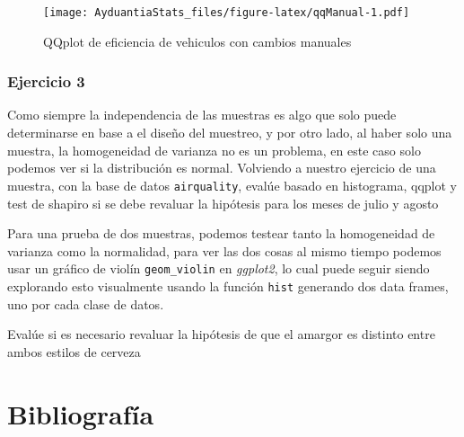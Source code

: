 \documentclass[]{book}
\newenvironment{Shaded}{\begin{snugshade}}{\end{snugshade}}
\newcommand{\KeywordTok}[1]{\textcolor[rgb]{0.13,0.29,0.53}{\textbf{#1}}}
\newcommand{\OperatorTok}[1]{\textcolor[rgb]{0.81,0.36,0.00}{\textbf{#1}}}
\newcommand{\NormalTok}[1]{#1}
\begin{document}
\begin{Shaded}
\end{Shaded}

\begin{figure}
\centering
\texttt{[image: AyduantiaStats\_files/figure-latex/qqManual-1.pdf]}
\caption{\label{fig:qqManual}QQplot de eficiencia de vehiculos con cambios
manuales}
\end{figure}

\subsubsection{Ejercicio 3}\label{ejercicio-3}

Como siempre la independencia de las muestras es algo que solo puede
determinarse en base a el diseño del muestreo, y por otro lado, al haber
solo una muestra, la homogeneidad de varianza no es un problema, en este
caso solo podemos ver si la distribución es normal. Volviendo a nuestro
ejercicio de una muestra, con la base de datos \texttt{airquality},
evalúe basado en histograma, qqplot y test de shapiro si se debe
revaluar la hipótesis para los meses de julio y agosto

Para una prueba de dos muestras, podemos testear tanto la homogeneidad
de varianza como la normalidad, para ver las dos cosas al mismo tiempo
podemos usar un gráfico de violín \texttt{geom\_violin} en
\emph{ggplot2}, lo cual puede seguir siendo explorando esto visualmente
usando la función \texttt{hist} generando dos data frames, uno por cada
clase de datos.

Evalúe si es necesario revaluar la hipótesis de que el amargor es
distinto entre ambos estilos de cerveza

\section{Bibliografía}\label{bibliografia}


\end{document}
